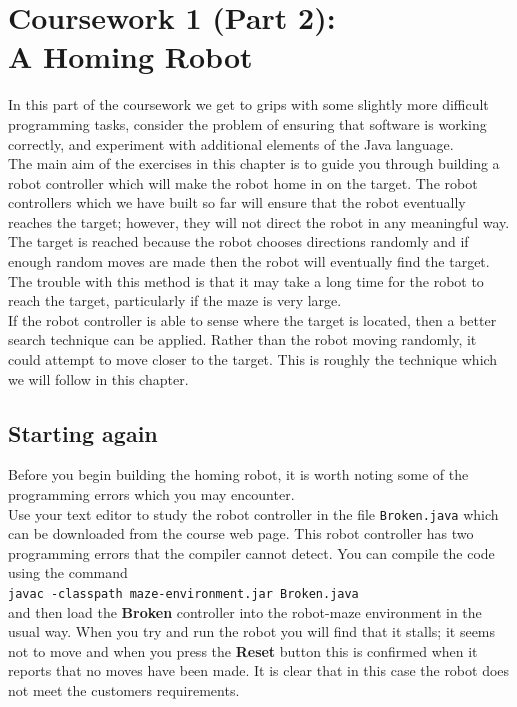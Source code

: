 \clearpage
\section{Coursework 1 (Part 2): \\ A Homing Robot}

In this part of the coursework we get to grips with some slightly more 
difficult
programming tasks, consider the problem of ensuring that software is working
correctly, and experiment with additional elements of the Java language. \\

\noindent
The main aim of the exercises in this chapter is to guide you through building
a robot controller which will make the robot home in on the target. The robot 
controllers which we have built so far will ensure that the robot eventually
reaches the target; however, they will not direct the robot in any 
meaningful way. The
target is reached because the robot chooses directions randomly and if 
enough random moves are made then the robot will eventually find the target.
The trouble with this method is that it may take a long time for the 
robot to reach the target, particularly if the maze is very large. \\

\noindent
If the robot controller is able to sense where the target is located, then
a better search technique can be applied. Rather than the robot moving 
randomly, it could attempt to move closer to the target. This
is roughly the technique which we will follow in this chapter.


\subsection{Starting again}

Before you begin building the homing robot, it is worth noting
some of the programming errors which you may encounter.\\

\noindent
Use your text editor to study the robot controller in the 
file {\tt Broken.java} 
which can be downloaded from the course web page. 
This robot controller has two programming errors that
the compiler cannot detect. You can compile the code using the 
command \\

{\tt javac -classpath maze-environment.jar Broken.java} \\

\noindent
and then load the {\bf Broken} controller into the robot-maze environment in 
the 
usual way. When you try and run the robot you will find that it stalls; it
seems not to move and when you press the {\bf Reset} button this is 
confirmed when it reports that 
no moves have been made. It is clear that in this case the robot does not 
meet the customers requirements. \\

